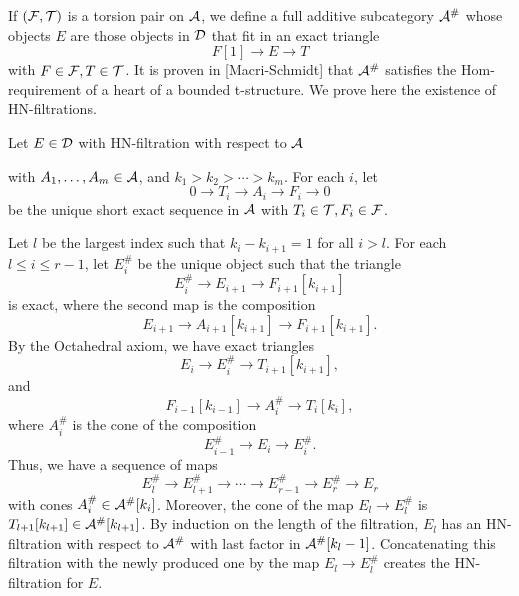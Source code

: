 \documentclass[letterpaper,10pt]{article}
\begin{document}
If $(\mathcal{F}, \mathcal{T})$ is a torsion pair on $\mathcal{A}$, we define a full additive subcategory $\mathcal{A}^\#$ whose objects $E$ are those objects in $\mathcal{D}$ that fit in an exact triangle
\[ F[1] \to E \to T \]
with $F \in \mathcal{F}, T \in \mathcal{T}$. It is proven in [Macri-Schmidt] that $\mathcal{A}^\#$ satisfies the Hom-requirement of a heart of a bounded t-structure. We prove here the existence of HN-filtrations.

Let $E \in \mathcal{D}$ with HN-filtration with respect to $\mathcal{A}$
\begin{center}
\end{center}
with $A_1, \ldots, A_m \in \mathcal{A}$, and $k_1 > k_2 > \cdots > k_m$. For each $i$, let 
\[ 0 \to T_i \to A_i \to F_i \to 0 \]
be the unique short exact sequence in $\mathcal{A}$ with $T_i \in \mathcal{T}, F_i \in \mathcal{F}$.

Let $l$ be the largest index such that $k_i - k_{i+1} = 1$ for all $i > l$. For each $l \le i \le r-1$, let $E_i^\#$ be the unique object such that the triangle
\[ E_i^\# \to E_{i+1} \to F_{i+1}[k_{i+1}] \]
is exact, where the second map is the composition 
\[ E_{i+1} \to A_{i+1}[k_{i+1}] \to F_{i+1}[k_{i+1}]. \]
By the Octahedral axiom, we have exact triangles
\[ E_i \to E_i^\# \to T_{i+1}[k_{i+1}], \]
and
\[ F_{i-1}[k_{i-1}] \to A_i^\# \to T_i[k_i], \]
where $A_i^\#$ is the cone of the composition
\[ E_{i-1}^\# \to E_i \to E_i^\#. \]
Thus, we have a sequence of maps
\[ E_l^\# \to E_{l+1}^\# \to \cdots \to E_{r-1}^\# \to E_r^\# \to E_r \]
with cones $A_i^\# \in \mathcal{A}^\#[k_i]$. Moreover, the cone of the map $E_l \to E_l^\#$ is $T_{l+1}[k_{l+1}] \in \mathcal{A}^\#[k_{l+1}]$. By induction on the length of the filtration, $E_l$ has an HN-filtration with respect to $\mathcal{A}^\#$ with last factor in $\mathcal{A}^\#[k_l-1]$. Concatenating this filtration with the newly produced one by the map $E_l \to E_l^\#$ creates the HN-filtration for $E$.
\end{document}
